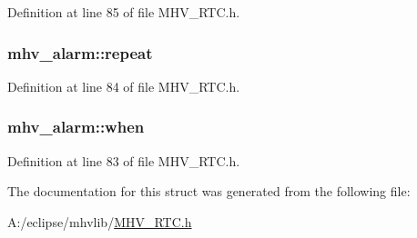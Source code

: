 \-Definition at line 85 of file \-M\-H\-V\-\_\-\-R\-T\-C.\-h.

\hypertarget{structmhv__alarm_ad8195c11cd5d6ff3bb37d01185c04af2}{
\subsubsection[{repeat}]{ {\bf mhv\-\_\-alarm\-::repeat}}}
\label{structmhv__alarm_ad8195c11cd5d6ff3bb37d01185c04af2}


\-Definition at line 84 of file \-M\-H\-V\-\_\-\-R\-T\-C.\-h.

\hypertarget{structmhv__alarm_acbab8b3b4efa4d891d598cbd5b47fb7c}{
\subsubsection[{when}]{ {\bf mhv\-\_\-alarm\-::when}}}
\label{structmhv__alarm_acbab8b3b4efa4d891d598cbd5b47fb7c}


\-Definition at line 83 of file \-M\-H\-V\-\_\-\-R\-T\-C.\-h.



\-The documentation for this struct was generated from the following file\-:\begin{DoxyCompactItemize}
\item 
\-A\-:/eclipse/mhvlib/\hyperlink{_m_h_v___r_t_c_8h}{\-M\-H\-V\-\_\-\-R\-T\-C.\-h}\end{DoxyCompactItemize}
